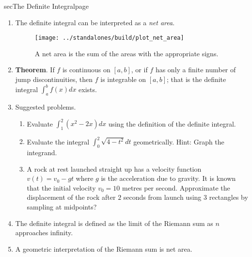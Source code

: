 \documentclass[../main]{subfiles}
\begin{document}
\begin{outline}{sec}{The Definite Integral}{page}
\begin{enumerate}
    \item The definite integral can be interpreted as a \emph{net area}. 
      \begin{figure}[h]  %
        \centering
        \texttt{[image: ../standalones/build/plot\_net\_area]}
        \caption{A net area is the sum of the areas with the appropriate signs.}
        \label{fig:net-area}
      \end{figure}
    \item \textbf{Theorem}. If \(f\) is continuous on \([a,b]\), or if \(f\) has only a finite number of jump discontinuities, then \(f\) is integrable on \([a,b]\); that is the definite integral \(\int_{a}^{b} f(x) dx\) exists.
    \item Suggested problems.
      \begin{enumerate}
        \item Evaluate \(\int_{1}^{2} (x^{2} - 2x) dx\) using the definition of the definite integral.
        \item Evaluate the integral \(\int_{0}^{2} \sqrt{4 - t^{2}} dt\) geometrically. Hint: Graph the integrand.
        \item \label{part:rocket} A rock at rest launched straight up has a velocity function \(v(t) = v_{0} - gt\) where \(g\) is the acceleration due to gravity. It is known that the initial velocity \(v_{0} = 10\) metres per second. Approximate the displacement of the rock after \(2\) seconds from launch using \(3\) rectangles by sampling at midpoints? 
      \end{enumerate}
    \item {The definite integral is defined as the limit of the Riemann sum as \(n\) approaches infinity.}
    \item {A geometric interpretation of the Riemann sum is net area.}
  \end{enumerate}
\end{outline}
\end{document}
